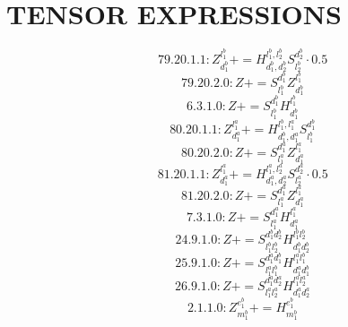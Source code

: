 \documentclass[letterpaper,10pt,fleqn,leqno,onecolumn]{article}
\begin{document}
\section{TENSOR EXPRESSIONS}
\begin{equation} \;\;\;\;\;\;  79.20.1.1: Z^{l_{1}^{b}}_{d_{1}^{b}}+=H^{l_{1}^{b},l_{2}^{b}}_{d_{1}^{b},d_{2}^{b}}S^{d_{2}^{b}}_{l_{2}^{b}}\cdot 0.5 \end{equation}
\begin{equation} \;\;\;\;\;\;  79.20.2.0: Z+=S^{d_{1}^{b}}_{l_{1}^{b}}Z^{l_{1}^{b}}_{d_{1}^{b}} \end{equation}
\begin{equation} \;\;\;\;\;\;  6.3.1.0: Z+=S^{d_{1}^{b}}_{l_{1}^{b}}H^{l_{1}^{b}}_{d_{1}^{b}} \end{equation}
\begin{equation} \;\;\;\;\;\;  80.20.1.1: Z^{l_{1}^{a}}_{d_{1}^{a}}+=H^{l_{1}^{b},l_{1}^{a}}_{d_{1}^{b},d_{1}^{a}}S^{d_{1}^{b}}_{l_{1}^{b}} \end{equation}
\begin{equation} \;\;\;\;\;\;  80.20.2.0: Z+=S^{d_{1}^{a}}_{l_{1}^{a}}Z^{l_{1}^{a}}_{d_{1}^{a}} \end{equation}
\begin{equation} \;\;\;\;\;\;  81.20.1.1: Z^{l_{1}^{a}}_{d_{1}^{a}}+=H^{l_{1}^{a},l_{2}^{a}}_{d_{1}^{a},d_{2}^{a}}S^{d_{2}^{a}}_{l_{2}^{a}}\cdot 0.5 \end{equation}
\begin{equation} \;\;\;\;\;\;  81.20.2.0: Z+=S^{d_{1}^{a}}_{l_{1}^{a}}Z^{l_{1}^{a}}_{d_{1}^{a}} \end{equation}
\begin{equation} \;\;\;\;\;\;  7.3.1.0: Z+=S^{d_{1}^{a}}_{l_{1}^{a}}H^{l_{1}^{a}}_{d_{1}^{a}} \end{equation}
\begin{equation} \;\;\;\;\;\;  24.9.1.0: Z+=S^{d_{1}^{b}d_{2}^{b}}_{l_{1}^{b}l_{2}^{b}}H^{l_{1}^{b}l_{2}^{b}}_{d_{1}^{b}d_{2}^{b}} \end{equation}
\begin{equation} \;\;\;\;\;\;  25.9.1.0: Z+=S^{d_{1}^{a}d_{1}^{b}}_{l_{1}^{a}l_{1}^{b}}H^{l_{1}^{a}l_{1}^{b}}_{d_{1}^{a}d_{1}^{b}} \end{equation}
\begin{equation} \;\;\;\;\;\;  26.9.1.0: Z+=S^{d_{1}^{a}d_{2}^{a}}_{l_{1}^{a}l_{2}^{a}}H^{l_{1}^{a}l_{2}^{a}}_{d_{1}^{a}d_{2}^{a}} \end{equation}
\begin{equation} \;\;\;\;\;\;  2.1.1.0: Z^{e_{1}^{b}}_{m_{1}^{b}}+=H^{e_{1}^{b}}_{m_{1}^{b}} \end{equation}
\end{document}
